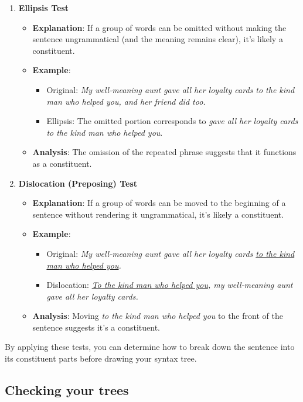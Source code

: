 \begin{enumerate}[noitemsep]
    \item \textbf{Ellipsis Test}
    \begin{itemize}[noitemsep]
        \item \textbf{Explanation}: If a group of words can be omitted without making the sentence ungrammatical (and the meaning remains clear), it's likely a constituent.
        \item \textbf{Example}:
        \begin{itemize}[noitemsep]
            \item Original: \textit{My well-meaning aunt gave all her loyalty cards to the kind man who helped you, and her friend did too.}
            \item Ellipsis: The omitted portion corresponds to \textit{gave all her loyalty cards to the kind man who helped you}.
        \end{itemize}
        \item \textbf{Analysis}: The omission of the repeated phrase suggests that it functions as a constituent.
    \end{itemize}
    
    \item \textbf{Dislocation (Preposing) Test}
    \begin{itemize}[noitemsep]
        \item \textbf{Explanation}: If a group of words can be moved to the beginning of a sentence without rendering it ungrammatical, it's likely a constituent.
        \item \textbf{Example}:
        \begin{itemize}[noitemsep]
            \item Original: \textit{My well-meaning aunt gave all her loyalty cards \underline{to the kind man who helped you}.}
            \item Dislocation: \textit{\underline{To the kind man who helped you}, my well-meaning aunt gave all her loyalty cards.}
        \end{itemize}
        \item \textbf{Analysis}: Moving \textit{to the kind man who helped you} to the front of the sentence suggests it's a constituent.
    \end{itemize}
\end{enumerate}

By applying these tests, you can determine how to break down the sentence into its constituent parts before drawing your syntax tree.


\subsection{Checking your trees}\label{sec:checkTrees}

